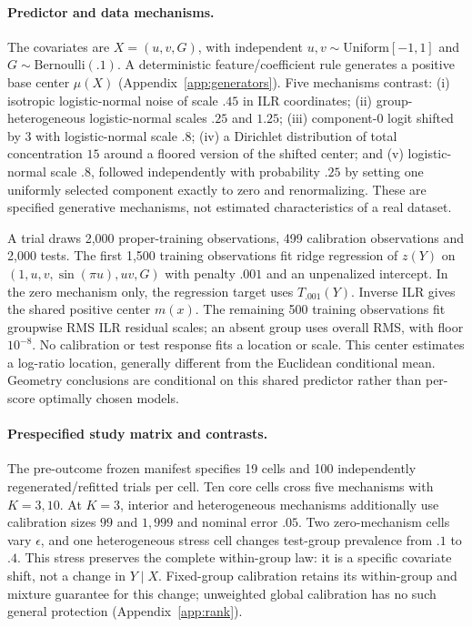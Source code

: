 \paragraph{Predictor and data mechanisms.}
The covariates are $X=(u,v,G)$, with independent $u,v\sim\mathrm{Uniform}[-1,1]$ and $G\sim\mathrm{Bernoulli}(.1)$. A deterministic feature/coefficient rule generates a positive base center $\mu(X)$ (Appendix~\ref{app:generators}). Five mechanisms contrast: (i) isotropic logistic-normal noise of scale $.45$ in ILR coordinates; (ii) group-heterogeneous logistic-normal scales $.25$ and $1.25$; (iii) component-0 logit shifted by $3$ with logistic-normal scale $.8$; (iv) a Dirichlet distribution of total concentration $15$ around a floored version of the shifted center; and (v) logistic-normal scale $.8$, followed independently with probability $.25$ by setting one uniformly selected component exactly to zero and renormalizing. These are specified generative mechanisms, not estimated characteristics of a real dataset.

A trial draws 2,000 proper-training observations, 499 calibration observations and 2,000 tests. The first 1,500 training observations fit ridge regression of $z(Y)$ on $(1,u,v,\sin(\pi u),uv,G)$ with penalty $.001$ and an unpenalized intercept. In the zero mechanism only, the regression target uses $T_{.001}(Y)$. Inverse ILR gives the shared positive center $m(x)$. The remaining 500 training observations fit groupwise RMS ILR residual scales; an absent group uses overall RMS, with floor $10^{-8}$. No calibration or test response fits a location or scale. This center estimates a log-ratio location, generally different from the Euclidean conditional mean. Geometry conclusions are conditional on this shared predictor rather than per-score optimally chosen models.

\paragraph{Prespecified study matrix and contrasts.}
The pre-outcome frozen manifest specifies 19 cells and 100 independently regenerated/refitted trials per cell. Ten core cells cross five mechanisms with $K=3,10$. At $K=3$, interior and heterogeneous mechanisms additionally use calibration sizes $99$ and $1{,}999$ and nominal error $.05$. Two zero-mechanism cells vary $\epsilon$, and one heterogeneous stress cell changes test-group prevalence from $.1$ to $.4$. This stress preserves the complete within-group law: it is a specific covariate shift, not a change in $Y\mid X$. Fixed-group calibration retains its within-group and mixture guarantee for this change; unweighted global calibration has no such general protection (Appendix~\ref{app:rank}).


